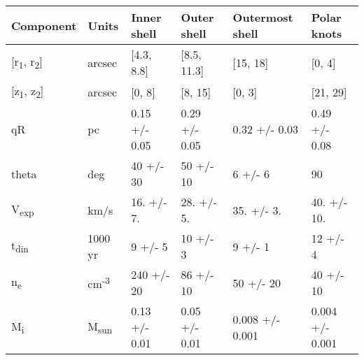 \begin{tabular}{llllll}
Component & Units & Inner shell & Outer shell & Outermost shell & Polar knots\\
\hline
{[}r\textsubscript{1}, r\textsubscript{2}] & arcsec & {[}4.3, 8.8] & {[}8.5, 11.3] & {[}15, 18] & {[}0, 4]\\
{[}z\textsubscript{1}, z\textsubscript{2}] & arcsec & {[}0, 8] & {[}8, 15] & {[}0, 3] & {[}21, 29]\\
qR & pc & 0.15 +/- 0.05 & 0.29 +/- 0.05 & 0.32 +/- 0.03 & 0.49 +/- 0.08\\
theta & deg & 40 +/- 30 & 50 +/- 10 & 6 +/- 6 & 90\\
V\textsubscript{exp} & km/s & 16. +/- 7. & 28. +/- 5. & 35. +/- 3. & 40. +/- 10.\\
t\textsubscript{din} & 1000 yr & 9 +/- 5 & 10 +/- 3 & 9 +/- 1 & 12 +/- 4\\
n\textsubscript{e} & cm\textsuperscript{-3} & 240 +/- 20 & 86 +/- 10 & 50 +/- 20 & 40 +/- 10\\
M\textsubscript{i} & M\textsubscript{sun} & 0.13 +/- 0.01 & 0.05 +/- 0.01 & 0.008 +/- 0.001 & 0.004 +/- 0.001\\
\end{tabular}
